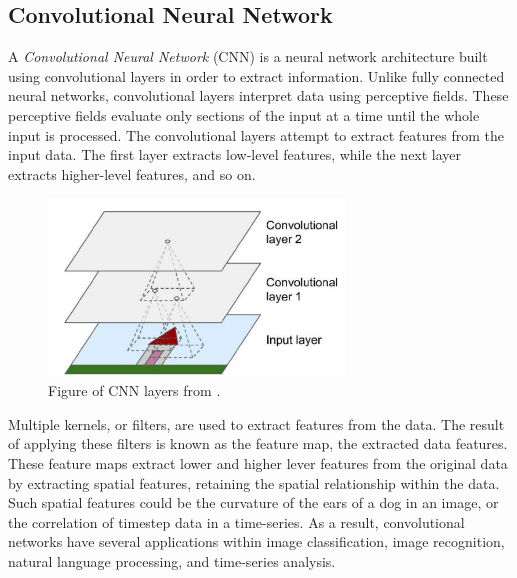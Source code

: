 \subsection{Convolutional Neural Network}
\label{section:BT:CNN}
A \textit{Convolutional Neural Network} (CNN) is a neural network architecture built using convolutional layers in order to extract information.
Unlike fully connected neural networks, convolutional layers interpret data using perceptive fields.
These perceptive fields evaluate only sections of the input at a time until the whole input is processed.
The convolutional layers attempt to extract features from the input data.
The first layer extracts low-level features, while the next layer extracts higher-level features, and so on.

\cite[p.~443-446]{Geron2017}


\begin{figure}[h!]
  \centering
  \includegraphics[width=0.7\textwidth]{./sections/BT/figures/convolution_hands_one_machine_learning.png}
  \hfill
  \caption{Figure of CNN layers from \cite[p.~444]{Geron2017}.}
  \label{fig:convolution}
\end{figure}


Multiple kernels, or filters, are used to extract features from the data.
The result of applying these filters is known as the feature map, the extracted data features.
These feature maps extract lower and higher lever features from the original data by
extracting spatial features, retaining the spatial relationship within the data.
Such spatial features could be the curvature of the ears of a dog in an image, or the correlation of timestep data in a time-series.
As a result, convolutional networks have several applications within image classification,
image recognition, natural language processing, and time-series analysis.

